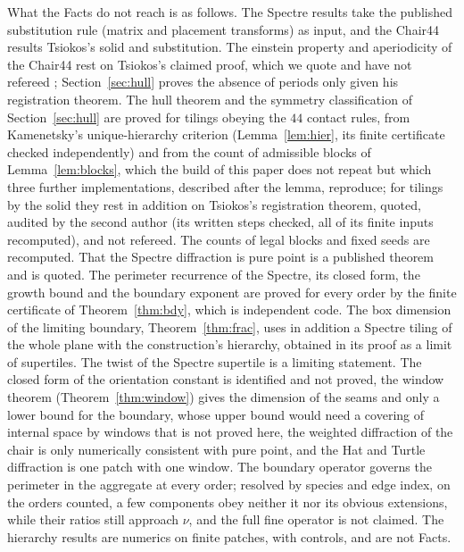 \documentclass[11pt]{article}
\theoremstyle{definition}
\theoremstyle{remark}
\begin{document}
What the Facts do not reach is as follows.  The Spectre results take the published substitution rule (matrix and placement
transforms) as input, and the Chair44 results Tsiokos's solid and substitution.  The einstein property and aperiodicity of
the Chair44 rest on Tsiokos's claimed proof, which we quote and have not refereed \cite{Tsiokos1}; Section~\ref{sec:hull}
proves the absence of periods only given his registration theorem.  The hull theorem and the symmetry
classification of Section~\ref{sec:hull} are proved for tilings obeying the $44$ contact rules, from Kamenetsky's
unique-hierarchy criterion (Lemma~\ref{lem:hier}, its finite certificate checked independently) and from the count of admissible blocks of
Lemma~\ref{lem:blocks}, which the build of this paper does not repeat but which three further implementations, described after the lemma, reproduce;
for tilings by the solid they rest in addition on Tsiokos's registration theorem, quoted, audited by the second author (its
written steps checked, all of its finite inputs recomputed), and not refereed.  The counts of legal blocks and fixed seeds
are recomputed.  That the Spectre diffraction is pure point is a published theorem and is quoted.  The perimeter recurrence
of the Spectre, its closed form, the growth bound and the boundary exponent are proved for every order by the finite
certificate of Theorem~\ref{thm:bdy}, which is independent code.  The box dimension of the limiting boundary,
Theorem~\ref{thm:frac}, uses in addition a Spectre tiling of the whole plane with the construction's hierarchy,
obtained in its proof as a limit of supertiles.  The twist of the Spectre supertile is a limiting statement.  The closed form of the orientation
constant is identified and not proved, the window theorem (Theorem~\ref{thm:window}) gives the dimension of the seams and only a lower bound for the boundary,
whose upper bound would need a covering of internal space by windows that is not proved here, the weighted diffraction of the
chair is only numerically consistent with pure point, and the Hat and Turtle diffraction is one patch with one window.
The boundary operator governs the perimeter in the aggregate at every order; resolved by species and edge index, on the orders counted, a
few components obey neither it nor its obvious extensions, while their ratios still approach $\nu$, and the full fine operator is not claimed.  The hierarchy results are numerics on finite
patches, with controls, and are not Facts.
\end{document}
